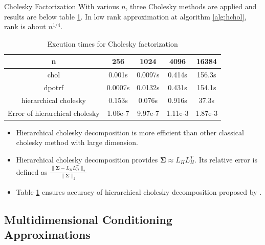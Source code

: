 \begin{frame}{Cholesky Factorization}
\footnotesize
With various $n$, three Cholesky methods are applied and results are below table \ref{tab:table1}. In low rank approximation at algorithm \ref{alg:hchol}, rank is about $n^{1/4}$.
\begin{table}[h]
	\centering
	{
		\begin{tabular}{@{}ccccc@{}}
			\toprule
			n & 256 & 1024 & 4096 & 16384 \\ \midrule
			chol & 0.001s & 0.0097s & 0.414s & 156.3s \\
			dpotrf & 0.0007s & 0.0132s & 0.431s & 154.1s \\
			hierarchical cholesky & 0.153s & 0.076s & 0.916s & 37.3s \\
			Error of hierarchical cholesky & 1.06e-7 & 9.97e-7 & 1.11e-3 & 1.87e-3 \\  \bottomrule
		\end{tabular}%
	}
	\caption{Excution times for Cholesky factorization}
	\label{tab:table1}
\end{table}
\begin{itemize}
	\item Hierarchical cholesky decomposition is more efficient than other classical cholesky method with large dimension.
	\item Hierarchical cholesky decomposition provides $\boldsymbol{\Sigma}\approx L_HL_H^T$. Its relative error is defined as $\frac{\lVert\boldsymbol{\Sigma}-L_HL_H^T\rVert_2}{\lVert\boldsymbol{\Sigma}\rVert_2}$
	\item Table \ref{tab:table1} ensures accuracy of hierarchical cholesky decomposition proposed by \citet{hackbusch2015hierarchical}.
\end{itemize}
\end{frame}

\subsection{Multidimensional Conditioning Approximations}

